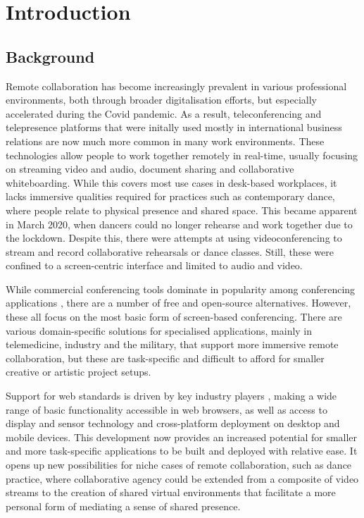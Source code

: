 \chapter{Introduction}
\label{chapter:introduction}

\section{Background}

Remote collaboration has become increasingly prevalent in various professional environments, both through broader digitalisation efforts, but especially accelerated during the Covid pandemic.
As a result, teleconferencing and telepresence platforms that were initally used mostly in international business relations are now much more common in many work environments.
These technologies allow people to work together remotely in real-time, usually focusing on streaming video and audio, document sharing and collaborative whiteboarding.
While this covers most use cases in desk-based workplaces, it lacks immersive qualities required for practices such as contemporary dance, where people relate to physical presence and shared space.
This became apparent in March 2020, when dancers could no longer rehearse and work together due to the lockdown.
Despite this, there were attempts at using videoconferencing to stream and record collaborative rehearsals or dance classes.
Still, these were confined to a screen-centric interface and limited to audio and video.

While commercial conferencing tools dominate in popularity among conferencing applications \parencite{mostPopularConferencingPlatforms}, there are a number of free and open-source alternatives.
However, these all focus on the most basic form of screen-based conferencing.
There are various domain-specific solutions for specialised applications, mainly in telemedicine, industry and the military, that support more immersive remote collaboration, but these are task-specific and difficult to afford for smaller creative or artistic project setups.

Support for web standards is driven by key industry players \parencite{pushingInteroperabilityForward}, making a wide range of basic functionality accessible in web browsers, as well as access to display and sensor technology and cross-platform deployment on desktop and mobile devices.
This development now provides an increased potential for smaller and more task-specific applications to be built and deployed with relative ease.
It opens up new possibilities for niche cases of remote collaboration, such as dance practice, where collaborative agency could be extended from a composite of video streams to the creation of shared virtual environments that facilitate a more personal form of mediating a sense of shared presence.

